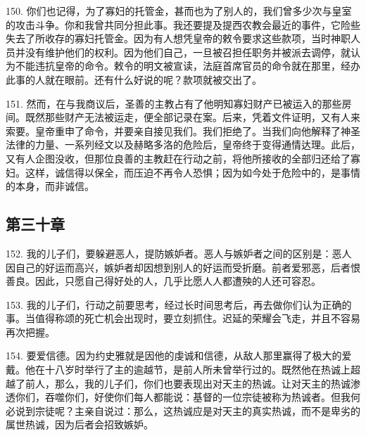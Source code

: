 150. 你们也记得，为了寡妇的托管金，甚而也为了别人的，我们曾多少次与皇室的攻击斗争。你和我曾共同分担此事。我还要提及提西农教会最近的事件，它险些失去了所收存的寡妇托管金。因为有人想凭皇帝的敕令要求这些款项，当时神职人员并没有维护他们的权利。因为他们自己，一旦被召担任职务并被派去调停，就认为不能违抗皇帝的命令。敕令的明文被宣读，法庭首席官员的命令就在那里，经办此事的人就在眼前。还有什么好说的呢？款项就被交出了。\par

151. 然而，在与我商议后，圣善的主教占有了他明知寡妇财产已被运入的那些房间。既然那些财产无法被运走，便全部记录在案。后来，凭着文件证明，又有人来索要。皇帝重申了命令，并要亲自接见我们。我们拒绝了。当我们向他解释了神圣法律的力量、一系列经文以及赫略多洛的危险后，皇帝终于变得通情达理。此后，又有人企图没收，但那位良善的主教赶在行动之前，将他所接收的全部归还给了寡妇。这样，诚信得以保全，而压迫不再令人恐惧；因为如今处于危险中的，是事情的本身，而非诚信。\par


\subsection{第三十章}

\par

152. 我的儿子们，要躲避恶人，提防嫉妒者。恶人与嫉妒者之间的区别是：恶人因自己的好运而高兴，嫉妒者却因想到别人的好运而受折磨。前者爱邪恶，后者恨善良。因此，只愿自己得好处的人，几乎比愿人人都遭殃的人还可容忍。\par

153. 我的儿子们，行动之前要思考，经过长时间思考后，再去做你们认为正确的事。当值得称颂的死亡机会出现时，要立刻抓住。迟延的荣耀会飞走，并且不容易再次把握。\par

154. 要爱信德。因为约史雅就是因他的虔诚和信德，从敌人那里赢得了极大的爱戴。他在十八岁时举行了主的逾越节，是前人所未曾举行过的。既然他在热诚上超越了前人，那么，我的儿子们，你们也要表现出对天主的热诚。让对天主的热诚渗透你们，吞噬你们，好使你们每人都能说：基督的一位宗徒被称为热诚者。但我何必说到宗徒呢？主亲自说过：那么，这热诚应是对天主的真实热诚，而不是卑劣的属世热诚，因为后者会招致嫉妒。\par

